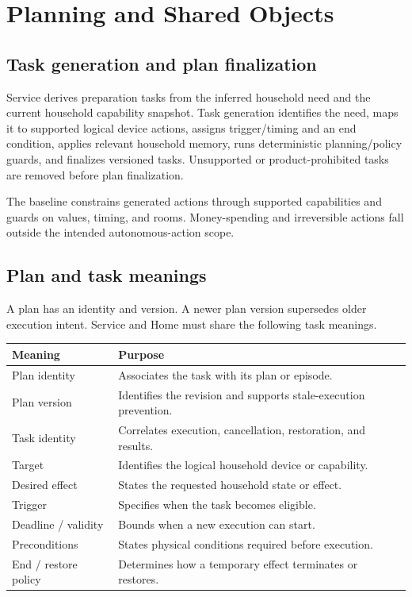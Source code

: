 \section{Planning and Shared Objects}
\label{sec:planning}

\subsection{Task generation and plan finalization}

Service derives preparation tasks from the inferred household need and the
current household capability snapshot. Task generation identifies the need,
maps it to supported logical device actions, assigns trigger/timing and an
end condition, applies relevant household memory, runs deterministic
planning/policy guards, and finalizes versioned tasks. Unsupported or
product-prohibited tasks are removed before plan finalization.

The baseline constrains generated actions through supported capabilities and
guards on values, timing, and rooms. Money-spending and irreversible actions
fall outside the intended autonomous-action scope. 

\subsection{Plan and task meanings}

A plan has an identity and version. A newer plan version supersedes older
execution intent. Service and Home must share the following task meanings.

{\small
\begin{tabularx}{\textwidth}{@{}L{0.25\textwidth}Y@{}}
\toprule
\textbf{Meaning} & \textbf{Purpose} \\
\midrule
Plan identity & Associates the task with its plan or episode. \\
Plan version & Identifies the revision and supports stale-execution prevention. \\
Task identity & Correlates execution, cancellation, restoration, and results. \\
Target & Identifies the logical household device or capability. \\
Desired effect & States the requested household state or effect. \\
Trigger & Specifies when the task becomes eligible. \\
Deadline / validity & Bounds when a new execution can start. \\
Preconditions & States physical conditions required before execution. \\
End / restore policy & Determines how a temporary effect terminates or restores. \\
\bottomrule
\end{tabularx}
\par
}

